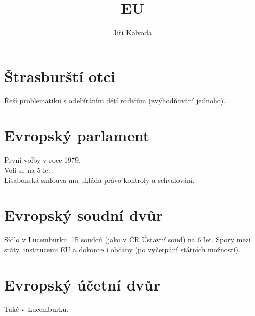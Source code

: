 \documentclass[a4]{article}
\title{EU}
\author{Jiří Kalvoda}
\begin{document}
\maketitle

\section{Štrasburští otci}
Řeší problematiku s odebíráním dětí rodičům (zvýhodňování jednoho).

\section{Evropský parlament}
První volby v roce 1979.\\
Volí se na 5 let.\\
Lisabonská smlouva mu ukládá právo kontroly a schvalování.

\section{Evropský soudní dvůr}
Sídlo v Lucemburku. 15 soudců (jako v ČR Ústavní soud) na 6 let.
Spory mezi státy, institucemi EU a dokonce i občany (po vyčerpání státních možností).

\section{Evropský účetní dvůr}
Také v Lucemburku. 
\end{document}
